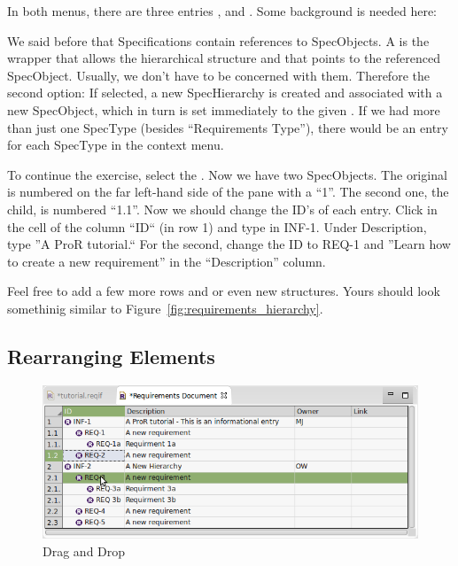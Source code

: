 In both menus, there are three entries ,  and .  Some background is needed here:

We said before that Specifications contain references to SpecObjects.  A  is the wrapper that allows the hierarchical structure and that points to the referenced SpecObject.  Usually, we don't have to be concerned with them.  Therefore the second option: If selected, a new SpecHierarchy is created and associated with a new SpecObject, which in turn is set immediately to the given .  If we had more than just one SpecType (besides ``Requirements Type''), there would be an entry for each SpecType in the context menu.

To continue the exercise, select the .  Now we have two SpecObjects.  The original is numbered on the far left-hand side of the pane with a ``1''.  The second one, the child, is numbered ``1.1''.  Now we should change the ID's of each entry.  Click in the cell of the column ``ID`` (in row 1) and type in INF-1.  Under Description, type ''A ProR tutorial.``  For the second, change the ID to REQ-1 and ''Learn how to create a new requirement'' in the ``Description'' column.

Feel free to add a few more rows and or even new structures.  Yours should look somethinig similar to Figure~\ref{fig:requirements_hierarchy}.

\subsection{Rearranging Elements}

\begin{figure}
\centering
\includegraphics[width=0.8\linewidth]{../rmf-images/draganddrop.png}    
\caption{Drag and Drop}      
\label{fig:dragAndDropChild}
\end{figure}

